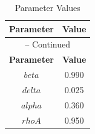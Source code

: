 \begin{center}
\begin{longtable}{cc}
\caption{Parameter Values}\\%
\toprule%
\multicolumn{1}{c}{\textbf{Parameter}} &
\multicolumn{1}{c}{\textbf{Value}}  \\%
\midrule%
\endfirsthead
\multicolumn{2}{c}{{\tablename} \thetable{} -- Continued}\\%
\midrule%
\multicolumn{1}{c}{\textbf{Parameter}} &
\multicolumn{1}{c}{\textbf{Value}} \\%
\midrule%
\endhead
$beta$ 	 & 	 0.990 \\
$delta$ 	 & 	 0.025 \\
$alpha$ 	 & 	 0.360 \\
$rhoA$ 	 & 	 0.950 \\
\bottomrule%
\end{longtable}
\end{center}
